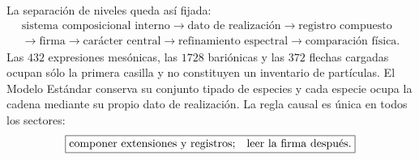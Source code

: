 La separación de niveles queda así fijada:
\[
\boxed{
\begin{gathered}
\text{sistema composicional interno}
\longrightarrow\text{dato de realización}
\longrightarrow\text{registro compuesto}\\
\longrightarrow\text{firma}
\longrightarrow\text{carácter central}
\longrightarrow\text{refinamiento espectral}
\longrightarrow\text{comparación física}.
\end{gathered}}
\]
Las \(432\) expresiones mesónicas, las \(1728\) bariónicas y las \(372\)
flechas cargadas ocupan sólo la primera casilla y no constituyen un
inventario de partículas. El Modelo Estándar conserva su conjunto tipado de
especies y cada especie ocupa la cadena mediante su propio dato de
realización. La regla causal es única en todos los sectores:
\[
 \boxed{\text{componer extensiones y registros;\quad leer la firma después}.}
\]
